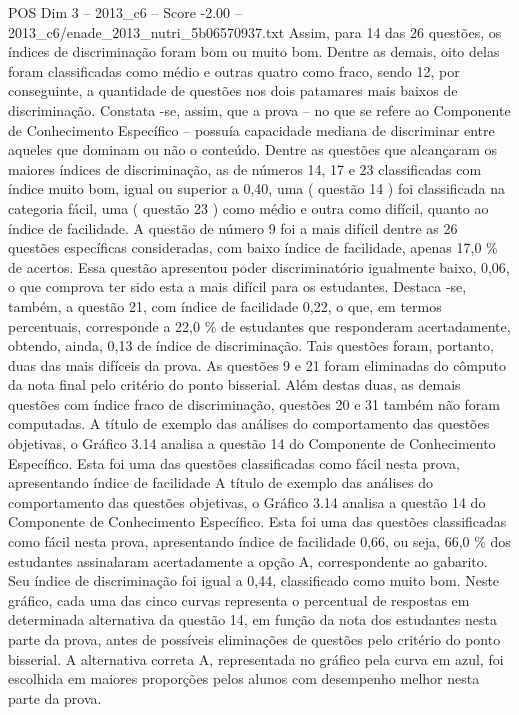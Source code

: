 \begin{textsample}{POS Dim 3 – 2013\_c6 – Score -2.00 – 2013\_c6/enade\_2013\_nutri\_5b06570937.txt}
Assim, para 14 das 26 questões, os índices de discriminação foram bom ou muito bom.
Dentre as demais, oito delas foram classificadas como médio e outras quatro como fraco, sendo 12, por conseguinte, a quantidade de questões nos dois patamares mais baixos de discriminação.
Constata -se, assim, que a prova – no que se refere ao Componente de Conhecimento Específico – possuía capacidade mediana de discriminar entre aqueles que dominam ou não o conteúdo.
Dentre as questões que alcançaram os maiores índices de discriminação, as de números 14, 17 e 23 classificadas com índice muito bom, igual ou superior a 0,40, uma ( questão 14 ) foi classificada na categoria fácil, uma ( questão 23 ) como médio e outra como difícil, quanto ao índice de facilidade.
A questão de número 9 foi a mais difícil dentre as 26 questões específicas consideradas, com baixo índice de facilidade, apenas 17,0 \% de acertos.
Essa questão apresentou poder discriminatório igualmente baixo, 0,06, o que comprova ter sido esta a mais difícil para os estudantes.
Destaca -se, também, a questão 21, com índice de facilidade 0,22, o que, em termos percentuais, corresponde a 22,0 \% de estudantes que responderam acertadamente, obtendo, ainda, 0,13 de índice de discriminação.
Tais questões foram, portanto, duas das mais difíceis da prova.
As questões 9 e 21 foram eliminadas do cômputo da nota final pelo critério do ponto bisserial.
Além destas duas, as demais questões com índice fraco de discriminação, questões 20 e 31 também não foram computadas.
A título de exemplo das análises do comportamento das questões objetivas, o Gráfico 3.14 analisa a questão 14 do Componente de Conhecimento Específico.
Esta foi uma das questões classificadas como fácil nesta prova, apresentando índice de facilidade A título de exemplo das análises do comportamento das questões objetivas, o Gráfico 3.14 analisa a questão 14 do Componente de Conhecimento Específico.
Esta foi uma das questões classificadas como fácil nesta prova, apresentando índice de facilidade 0,66, ou seja, 66,0 \% dos estudantes assinalaram acertadamente a opção A, correspondente ao gabarito.
Seu índice de discriminação foi igual a 0,44, classificado como muito bom.
Neste gráfico, cada uma das cinco curvas representa o percentual de respostas em determinada alternativa da questão 14, em função da nota dos estudantes nesta parte da prova, antes de possíveis eliminações de questões pelo critério do ponto bisserial.
A alternativa correta A, representada no gráfico pela curva em azul, foi escolhida em maiores proporções pelos alunos com desempenho melhor nesta parte da prova.

\end{textsample}
